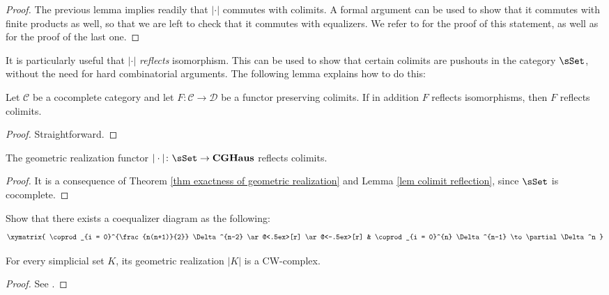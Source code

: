 \begin{refsection}
\begin{proof}
The previous lemma implies readily that $| \cdot |$ commutes with colimits. A formal argument can be used to show that it commutes with finite products as well, so that we are left to check that it commutes with equalizers. We refer to \cite[Ch. III.3]{gz} for the proof of this statement, as well as for the proof of the last one.
\end{proof}

It is particularly useful that $| \cdot |$ \emph{reflects} isomorphism. This can be used to show that certain colimits are pushouts in the category $\sSet$, without the need for hard combinatorial arguments. The following lemma explains how to do this:

\begin{lemma} \label{lem colimit reflection}
Let $\mathcal C$ be a cocomplete category and let $F \colon \mathcal C \to \mathcal D$ be a functor preserving colimits. If in addition $F$ reflects isomorphisms, then $F$ reflects colimits.
\end{lemma}

\begin{proof}
Straightforward.
\end{proof}

\begin{cor} \label{cor colimit in sset}
The geometric realization functor $| \cdot | \colon \sSet \to \mathbf{CGHaus}$ reflects colimits.
\end{cor}

\begin{proof}
It is a consequence of Theorem \ref{thm exactness of geometric realization} and Lemma \ref{lem colimit reflection}, since $\sSet$ is cocomplete.
\end{proof}

\begin{exercise}
Show that there exists a coequalizer diagram as the following:
\[
\xymatrix{
\coprod_{i = 0}^{\frac{n(n+1)}{2}} \Delta^{n-2} \ar@<.5ex>[r] \ar@<-.5ex>[r] & \coprod_{i = 0}^{n} \Delta^{n-1} \to \partial \Delta^n
}
\]
\end{exercise}

\begin{cor}
For every simplicial set $K$, its geometric realization $|K|$ is a CW-complex.
\end{cor}

\begin{proof}
See \cite[Proposition I.2.3]{gj}.
\end{proof}


\end{refsection}

